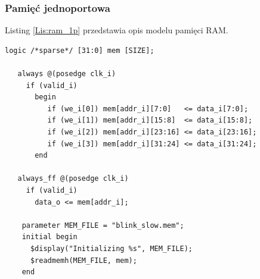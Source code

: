 \documentclass[11pt,a4paper]{article}
\begin{document}
		\subsubsection{Pamięć jednoportowa}
			\hspace{5mm}
			Listing \ref{Lis:ram_1p} przedstawia opis modelu pamięci RAM.\\
			\begin{minipage}{\textwidth}
\begin{scriptsize}
\begin{lstlisting}[label=Lis:ram_1p,caption=Model pamięci RAM]
    logic /*sparse*/ [31:0] mem [SIZE];

   always @(posedge clk_i)
     if (valid_i)
       begin
          if (we_i[0]) mem[addr_i][7:0]   <= data_i[7:0];
          if (we_i[1]) mem[addr_i][15:8]  <= data_i[15:8];
          if (we_i[2]) mem[addr_i][23:16] <= data_i[23:16];
          if (we_i[3]) mem[addr_i][31:24] <= data_i[31:24];
       end

   always_ff @(posedge clk_i)
     if (valid_i)
       data_o <= mem[addr_i];

    parameter MEM_FILE = "blink_slow.mem";
    initial begin
      $display("Initializing %s", MEM_FILE);
      $readmemh(MEM_FILE, mem);
    end
\end{lstlisting}
\end{scriptsize}
\end{minipage}
\end{document}
